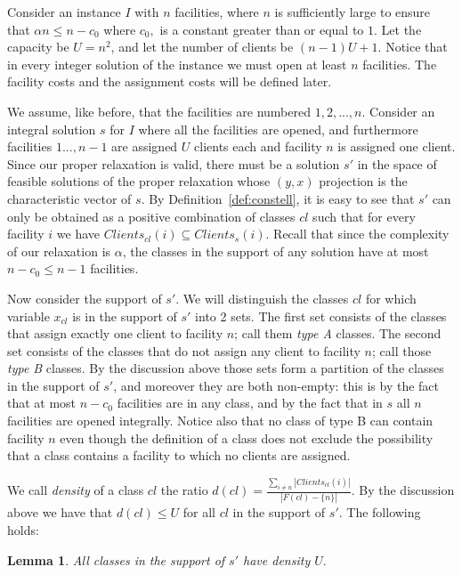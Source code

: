 \documentclass[11pt]{article}\usepackage{amsmath}
\newtheorem{lemma}{Lemma}[section]
\begin{document}
Consider
an instance $I$ with $n$ facilities, where $n$ is
sufficiently large to ensure  that $\alpha n \leq n - c_0$  where
$c_0,$  is a
constant greater than or equal to  $1$. Let the capacity be $U=n^2$, and let
the number of  clients be $(n-1)U+1$. Notice that in every integer solution of the instance
 we must open  at least $n$ facilities. The  facility costs  and the assignment  costs will  be defined
later.  

 We  assume, like before, that  the  facilities are  numbered
$1,2,...,n$. 
Consider  an  integral  solution  $s$  for $I$   where  all the
facilities  are opened, and furthermore 
facilities $1..., n-1$  are assigned $U$ clients each 
and facility $n$ is assigned one client. 
Since our proper  relaxation is valid, there must be a solution $s'$ in the  space of
feasible solutions of the proper relaxation whose $(y,x)$ projection is the characteristic 
vector of $s$.  
By Definition~\ref{def:constell},
it is easy to see that $s'$ can only be obtained as a 
positive combination of classes $cl$ such that for
every    facility   $i$    we   have    $Clients_{cl}(i)   \subseteq
Clients_s(i)$.  Recall  that  since  the  complexity  of  our
relaxation is $\alpha$, the classes in the support of any solution 
have at most $n-c_0 \leq n-1$
facilities. 

Now consider the support  of $s'$. We will distinguish the classes $cl$ for
which variable $x_{cl}$ is in the support of $s'$ into 2 sets. The first set consists 
of the classes that assign exactly one client to facility $n$; call them \emph{type A} classes.
The second set  consists  of the classes that do not assign any client to facility 
$n$; call those \emph{type B} classes. By the discussion above those sets form a
partition of the classes in the support of $s'$, and moreover they are both non-empty: this is
 by the fact that at most  $n-c_0$ facilities are in any class, and by the fact
 that in $s$ all $n$ 
facilities are opened integrally. Notice also that no  class
of type B can contain facility $n$ even though the definition of a class does not
exclude the possibility that a class contains a facility to which no clients are
assigned. 

We call \emph{density} of  a class $cl$ the ratio 
$d(cl)=\frac{\sum_{i\neq n}|Clients_{cl}(i)|}{|F(cl)-\{n\}|}$. By the discussion 
above we have that $d(cl)\leq U$ for all $cl$ in the support of $s'$. The following holds:

\begin{lemma}
All classes in the support of $s'$ have density $U.$
\end{lemma}
\end{document}
